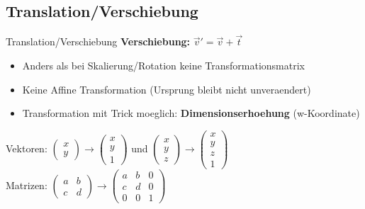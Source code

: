 \documentclass[10pt,aspectratio=169]{beamer}
\begin{document}
  \subsection{Translation/Verschiebung}
  \begin{frame}{Translation/Verschiebung}
    \textbf{Verschiebung:}
    $\vec{v}' = \vec{v} + \vec{t}$
    \begin{itemize}
      \item Anders als bei Skalierung/Rotation keine Transformationsmatrix
      \item Keine Affine Transformation (Ursprung bleibt nicht unveraendert)
      \item Transformation mit Trick moeglich: \textbf{Dimensionserhoehung} (w-Koordinate)
    \end{itemize}
    Vektoren: $\begin{pmatrix}
      x\\y
    \end{pmatrix}\rightarrow \begin{pmatrix}
      x\\y\\1
    \end{pmatrix}$ und $\begin{pmatrix}
      x\\y\\z
    \end{pmatrix}\rightarrow \begin{pmatrix}
      x\\y\\z\\1
    \end{pmatrix}$
    \\
    Matrizen: $\begin{pmatrix}
      a & b\\
      c & d
    \end{pmatrix}
    \rightarrow
    \begin{pmatrix}
      a & b & 0\\
      c & d & 0\\
      0 & 0 & 1
    \end{pmatrix}
    $
  \end{frame}
\end{document}
